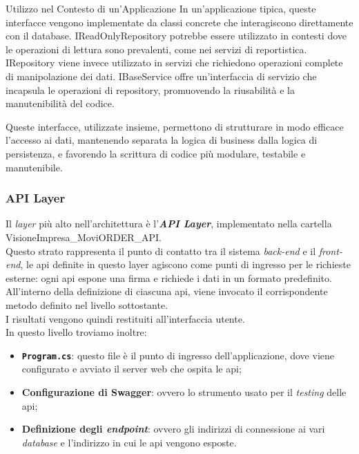 Utilizzo nel Contesto di un'Applicazione
In un'applicazione tipica, queste interfacce vengono implementate da classi concrete che interagiscono direttamente con il database. IReadOnlyRepository potrebbe essere utilizzato in contesti dove le operazioni di lettura sono prevalenti, come nei servizi di reportistica. IRepository viene invece utilizzato in servizi che richiedono operazioni complete di manipolazione dei dati. IBaseService offre un'interfaccia di servizio che incapsula le operazioni di repository, promuovendo la riusabilità e la manutenibilità del codice.

Queste interfacce, utilizzate insieme, permettono di strutturare in modo efficace l'accesso ai dati, mantenendo separata la logica di business dalla logica di persistenza, e favorendo la scrittura di codice più modulare, testabile e manutenibile.


\subsubsection{API Layer}
Il \textit{layer} più alto nell'architettura è l'\textit{\textbf{API Layer}}, implementato nella cartella 
VisioneImpresa\_MoviORDER\_API.\\
Questo strato rappresenta il punto di contatto tra il sistema \textit{back-end} e il \textit{front-end}, 
le \gls{api} definite in questo layer agiscono come punti di ingresso per le richieste esterne: ogni \gls{api} espone 
una firma e richiede i dati in un formato predefinito.\\
All'interno della definizione di ciascuna \gls{api}, viene invocato il corrispondente metodo definito nel livello sottostante.\\
I risultati vengono quindi restituiti all'interfaccia utente.\\
In questo livello troviamo inoltre:
\begin{itemize}
    \item \textbf{\texttt{Program.cs}}: questo file è il punto di ingresso dell'applicazione, dove viene configurato e avviato il 
           server web che ospita le \gls{api};
    \item \textbf{Configurazione di Swagger}: ovvero lo strumento usato per il \textit{testing} delle \gls{api};
    \item \textbf{Definizione degli \textit{endpoint}}: ovvero gli indirizzi di connessione ai vari \textit{database} 
          e l'indirizzo in cui le \gls{api} vengono esposte.
\end{itemize}
